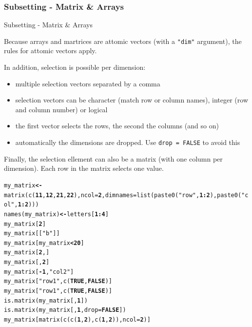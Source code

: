 \documentclass{beamer}\usepackage[]{graphicx}\usepackage[]{color}
\makeatletter
\newcommand{\hlnum}[1]{\textcolor[rgb]{0.502,0,0.502}{\textbf{#1}}}%
\newcommand{\hlstr}[1]{\textcolor[rgb]{0.651,0.522,0}{#1}}%
\newcommand{\hlopt}[1]{\textcolor[rgb]{1,0,0.502}{\textbf{#1}}}%
\newcommand{\hlstd}[1]{\textcolor[rgb]{0,0,0}{#1}}%
\newcommand{\hlkwb}[1]{\textcolor[rgb]{0.502,0.502,0.753}{\textbf{#1}}}%
\newcommand{\hlkwc}[1]{\textcolor[rgb]{0,0.502,0.753}{#1}}%
\newcommand{\hlkwd}[1]{\textcolor[rgb]{0,0.267,0.4}{#1}}%
\newenvironment{kframe}{%
 \def\at@end@of@kframe{}%
 \ifinner\ifhmode%
  \def\at@end@of@kframe{\end{minipage}}%
  \begin{minipage}{\columnwidth}%
 \fi\fi%
 \def\FrameCommand##1{\hskip\@totalleftmargin \hskip-\fboxsep
 \colorbox{shadecolor}{##1}\hskip-\fboxsep
     \hskip-\linewidth \hskip-\@totalleftmargin \hskip\columnwidth}%
 \MakeFramed {\advance\hsize-\width
   \@totalleftmargin\z@ \linewidth\hsize
   \@setminipage}}%
 {\par\unskip\endMakeFramed%
 \at@end@of@kframe}
\newenvironment{knitrout}{}{} %
\makeatother
\begin{document}
\subsubsection{Subsetting - Matrix \& Arrays}


\begin{frame}[fragile]{Subsetting - Matrix \& Arrays}

Because arrays and martrices are attomic vectors (with a \texttt{"dim"} argument), the rules for attomic vectors apply.

In addition, selection is possible per dimension:

\begin{itemize}
  \item multiple selection vectors separated by a comma
  \item selection vectors can be character (match row or column names), integer (row and column number) or logical
  \item the first vector selects the rows, the second the columns (and so on)
  \item automatically the dimensions are dropped. Use \texttt{drop = FALSE} to avoid this
\end{itemize}

Finally, the selection ellement can also be a matrix (with one column per dimension). Each row in the matrix selects one value.

\begin{knitrout}
\color{fgcolor}\begin{kframe}
\begin{alltt}
\hlstd{my_matrix} \hlkwb{<-} \hlkwd{matrix}\hlstd{(}\hlkwd{c}\hlstd{(}\hlnum{11}\hlstd{,} \hlnum{12}\hlstd{,} \hlnum{21}\hlstd{,} \hlnum{22}\hlstd{),} \hlkwc{ncol} \hlstd{=} \hlnum{2}\hlstd{,} \hlkwc{dimnames} \hlstd{=} \hlkwd{list}\hlstd{(}\hlkwd{paste0}\hlstd{(}\hlstr{"row"}\hlstd{,} \hlnum{1}\hlopt{:}\hlnum{2}\hlstd{),} \hlkwd{paste0}\hlstd{(}\hlstr{"col"}\hlstd{,} \hlnum{1}\hlopt{:}\hlnum{2}\hlstd{)))}
\hlkwd{names}\hlstd{(my_matrix)} \hlkwb{<-} \hlstd{letters[}\hlnum{1}\hlopt{:}\hlnum{4}\hlstd{]}
\hlstd{my_matrix[}\hlnum{2}\hlstd{]}
\hlstd{my_matrix[[}\hlstr{"b"}\hlstd{]]}
\hlstd{my_matrix[my_matrix} \hlopt{<} \hlnum{20}\hlstd{]}
\hlstd{my_matrix[}\hlnum{2}\hlstd{,]}
\hlstd{my_matrix[,}\hlnum{2}\hlstd{]}
\hlstd{my_matrix[}\hlopt{-}\hlnum{1}\hlstd{,}\hlstr{"col2"}\hlstd{]}
\hlstd{my_matrix[}\hlstr{"row1"}\hlstd{,}\hlkwd{c}\hlstd{(}\hlnum{TRUE}\hlstd{,} \hlnum{FALSE}\hlstd{)]}
\hlstd{my_matrix[}\hlstr{"row1"}\hlstd{,}\hlkwd{c}\hlstd{(}\hlnum{TRUE}\hlstd{,} \hlnum{FALSE}\hlstd{)]}
\hlkwd{is.matrix}\hlstd{(my_matrix[,}\hlnum{1}\hlstd{])}
\hlkwd{is.matrix}\hlstd{(my_matrix[,}\hlnum{1}\hlstd{,} \hlkwc{drop} \hlstd{=} \hlnum{FALSE}\hlstd{])}
\hlstd{my_matrix[}\hlkwd{matrix}\hlstd{(}\hlkwd{c}\hlstd{(}\hlkwd{c}\hlstd{(}\hlnum{1}\hlstd{,} \hlnum{2}\hlstd{),} \hlkwd{c}\hlstd{(}\hlnum{1}\hlstd{,} \hlnum{2}\hlstd{)),} \hlkwc{ncol} \hlstd{=} \hlnum{2}\hlstd{)]}
\end{alltt}
\end{kframe}
\end{knitrout}

\end{frame}
\end{document}
